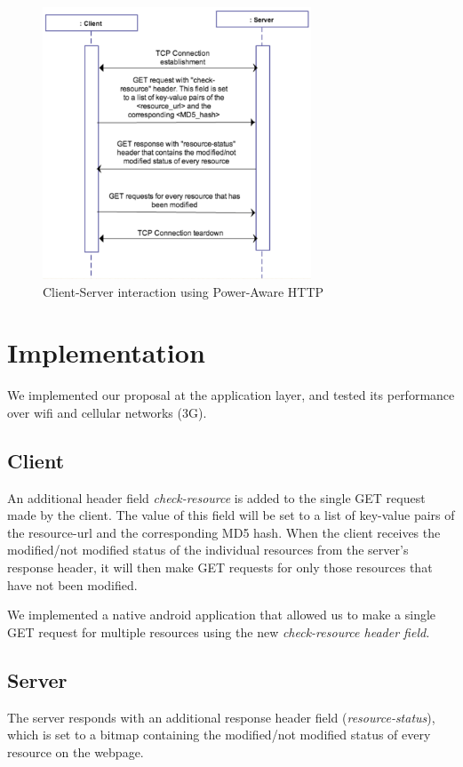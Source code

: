 \documentclass{sigplanconf}
\begin{document}
\begin{figure}[ht!]
\centering
\includegraphics[width=80mm]{proposal}
\caption{Client-Server interaction using Power-Aware HTTP }
\label{fig:sp_gd_mnist}
\end{figure}

\section{Implementation}

We implemented our proposal at the application layer, and tested its performance over wifi and cellular networks (3G).

\subsection{Client}

An additional header field {\it check-resource} is added to the single GET request made by the client. The value of this field will be set to a list of key-value pairs of the resource-url and the corresponding MD5 hash. When the client receives the modified/not modified status of the individual resources from the server's response header, it will then make GET requests for only those resources that have not been modified.

We implemented a native android application that allowed us to make a single GET request for multiple resources using the new \it{check-resource} \rm header field.

\subsection{Server}

The server responds with an additional response header field ({\it resource-status}),  which is set to a bitmap containing the modified/not modified status of every resource on the webpage. 
\end{document}
